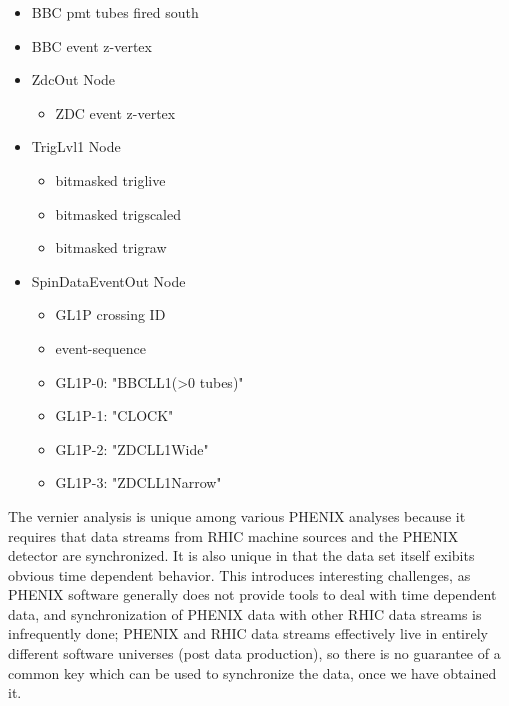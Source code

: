 \begin{itemize}
\begin{itemize}
\begin{itemize}
      \item BBC pmt tubes fired south
      \item BBC event z-vertex
    \end{itemize}
  \end{itemize}
  \begin{itemize}
  \item ZdcOut Node
    \begin{itemize}
      \item ZDC event z-vertex
    \end{itemize}
  \end{itemize}
  \begin{itemize}
  \item TrigLvl1 Node
    \begin{itemize}
      \item bitmasked triglive
      \item bitmasked trigscaled
      \item bitmasked trigraw
    \end{itemize}
  \end{itemize}  
  \begin{itemize}
  \item SpinDataEventOut Node
    \begin{itemize}
      \item GL1P crossing ID
      \item event-sequence
      \item GL1P-0: "BBCLL1(\textgreater0 tubes)"
      \item GL1P-1: "CLOCK"
      \item GL1P-2: "ZDCLL1Wide"
      \item GL1P-3: "ZDCLL1Narrow"
    \end{itemize}
  \end{itemize}  
\end{itemize}

The vernier analysis is unique among various PHENIX analyses because it requires that data
streams from RHIC machine sources and the PHENIX detector are synchronized. It is also
unique in that the data set itself exibits obvious time dependent behavior. This
introduces interesting challenges, as PHENIX software generally does not provide tools to
deal with time dependent data, and synchronization of PHENIX data with other RHIC data
streams is infrequently done; PHENIX and RHIC data streams effectively live in entirely
different software universes (post data production), so there is no guarantee of a common
key which can be used to synchronize the data, once we have obtained it. 

